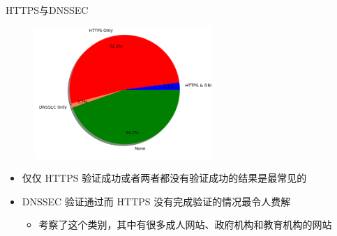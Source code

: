 \documentclass{beamer}
\begin{document}
\begin{frame}{HTTPS与DNSSEC}

  \begin{figure}
    \includegraphics[height=5cm]{images/figure/httpsdnssec.png}
  \end{figure}

  \begin{itemize}
    \item 仅仅 HTTPS 验证成功或者两者都没有验证成功的结果是最常见的
    \item DNSSEC 验证通过而 HTTPS 没有完成验证的情况最令人费解
    \begin{itemize}
      \item 考察了这个类别，其中有很多成人网站、政府机构和教育机构的网站
    \end{itemize}
  \end{itemize}
  \end{frame}

\end{document}
